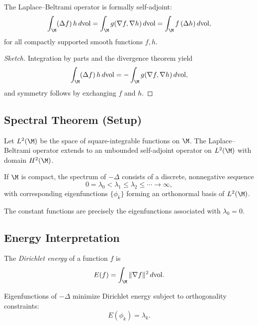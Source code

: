 \begin{theorem}
The Laplace--Beltrami operator is formally self-adjoint:
\[
\int_\M (\Delta f)\, h \, d\mathrm{vol}
= \int_\M g(\nabla f, \nabla h)\, d\mathrm{vol}
= \int_\M f\, (\Delta h)\, d\mathrm{vol},
\]
for all compactly supported smooth functions $f,h$.
\end{theorem}

\begin{proof}[Sketch]
Integration by parts and the divergence theorem yield
\[
\int_\M (\Delta f)\, h\, d\mathrm{vol}
= -\int_\M g(\nabla f, \nabla h)\, d\mathrm{vol},
\]
and symmetry follows by exchanging $f$ and $h$.
\end{proof}

\subsection{Spectral Theorem (Setup)}

\begin{definition}
Let $L^2(\M)$ be the space of square-integrable functions on $\M$.  
The Laplace--Beltrami operator extends to an unbounded self-adjoint
operator on $L^2(\M)$ with domain $H^2(\M)$.
\end{definition}

\begin{theorem}
If $\M$ is compact, the spectrum of $-\Delta$ consists of a discrete,
nonnegative sequence
\[
0 = \lambda_0 < \lambda_1 \le \lambda_2 \le \cdots \to \infty,
\]
with corresponding eigenfunctions $\{\phi_k\}$ forming an orthonormal
basis of $L^2(\M)$.
\end{theorem}

\begin{lemma}
The constant functions are precisely the eigenfunctions associated with
$\lambda_0 = 0$.
\end{lemma}

\subsection{Energy Interpretation}

\begin{definition}
The \emph{Dirichlet energy} of a function $f$ is
\[
E(f) = \int_\M \|\nabla f\|^2\, d\mathrm{vol}.
\]
\end{definition}

\begin{lemma}
Eigenfunctions of $-\Delta$ minimize Dirichlet energy subject to
orthogonality constraints:
\[
E(\phi_k) = \lambda_k.
\]
\end{lemma}

